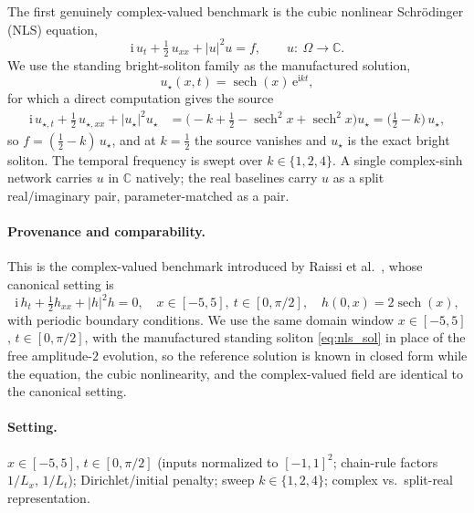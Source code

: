 The first genuinely complex-valued benchmark is the cubic nonlinear
Schr\"odinger (NLS) equation,
\begin{equation}\label{eq:nls_pde}
  \mathrm{i}\,u_t + \tfrac12\,u_{xx} + |u|^2 u = f,
  \qquad u:\ \Omega \to \mathbb{C}.
\end{equation}
We use the standing bright-soliton family as the manufactured solution,
\begin{equation}\label{eq:nls_sol}
  u_\star(x,t) = \operatorname{sech}(x)\,\mathrm{e}^{\mathrm{i}kt},
\end{equation}
for which a direct computation gives the source
\begin{align}\label{eq:nls_source}
  \mathrm{i}\,u_{\star,t} + \tfrac12\,u_{\star,xx} + |u_\star|^2 u_\star
  &= \Big(\!-k + \tfrac12 - \operatorname{sech}^2 x + \operatorname{sech}^2 x\Big) u_\star
   = \big(\tfrac12 - k\big)\,u_\star ,
\end{align}
so \(f = (\tfrac12 - k)\,u_\star\), and at \(k = \tfrac12\) the source vanishes
and \(u_\star\) is the exact bright soliton. The temporal frequency is swept over
\(k \in \{1,2,4\}\). A single complex-sinh network carries \(u\) in
\(\mathbb{C}\) natively; the real baselines carry \(u\) as a split real/imaginary
pair, parameter-matched as a pair.

\paragraph{Provenance and comparability.}
This is the complex-valued benchmark introduced by Raissi et
al.~\cite{Raissi2019}, whose canonical setting is
\begin{equation}\label{eq:nls_raissi}
  \mathrm{i}\,h_t + \tfrac12 h_{xx} + |h|^2 h = 0,
  \quad x\in[-5,5],\ t\in[0,\pi/2],\quad
  h(0,x) = 2\operatorname{sech}(x),
\end{equation}
with periodic boundary conditions. We use the same domain window
\(x\in[-5,5]\), \(t\in[0,\pi/2]\), with the manufactured standing soliton
\eqref{eq:nls_sol} in place of the free amplitude-\(2\) evolution, so the
reference solution is known in closed form while the equation, the cubic
nonlinearity, and the complex-valued field are identical to the canonical
setting.

\paragraph{Setting.}
\(x\in[-5,5]\), \(t\in[0,\pi/2]\) (inputs normalized to \([-1,1]^2\); chain-rule
factors \(1/L_x\), \(1/L_t\)); Dirichlet/initial penalty; sweep \(k\in\{1,2,4\}\);
complex vs.\ split-real representation.

